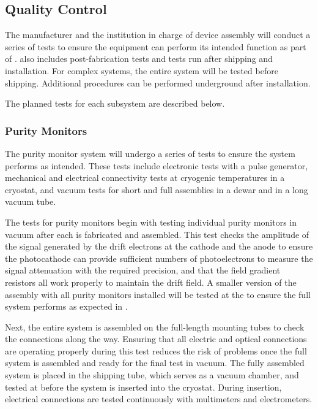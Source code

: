 \subsection{Quality Control}
\label{sec:fdsp-slow-cryo-qc}
The manufacturer and the institution in charge of device assembly will conduct a series of tests to ensure the equipment can perform its intended function as part of .  also includes post-fabrication tests and tests run after shipping and installation. For complex systems, the entire system will be tested before shipping. 
Additional  procedures can be performed %
underground after installation. %

The planned tests for each subsystem are described below.  


\subsubsection{Purity Monitors}
\label{sec:fdgen-slow-cryo-qc-pm}


The purity monitor system will undergo a series of tests to ensure the
system performs as intended. These tests 
include electronic tests
with a pulse generator, mechanical and electrical connectivity tests
at cryogenic temperatures in a cryostat, and vacuum tests for short
and full assemblies in a dewar and in a long vacuum tube.

The  tests for  purity monitors begin with testing
individual purity monitors in vacuum after each is fabricated and
assembled.  This test checks the amplitude of the signal generated by
the drift electrons at the cathode and the anode to ensure the
photocathode can provide sufficient numbers of photoelectrons to
measure the signal attenuation
with the required precision, and that the field gradient resistors all work properly to maintain the drift field. %
A smaller version of the assembly with all purity monitors installed will be  tested at the  %
to ensure the full system performs as expected in .  

Next, %
the entire system %
is assembled on the full-length mounting tubes to check the connections along the way.  Ensuring that all electric and optical connections are operating properly during this test reduces the risk of problems once the full system is assembled and ready for the final test in vacuum.  %
The fully assembled system %
is placed in the shipping tube, which %
serves as a vacuum chamber, and tested at \surf %
 before the system is inserted into the  %
 cryostat. During insertion, electrical connections %
 are tested continuously with multimeters and electrometers.



